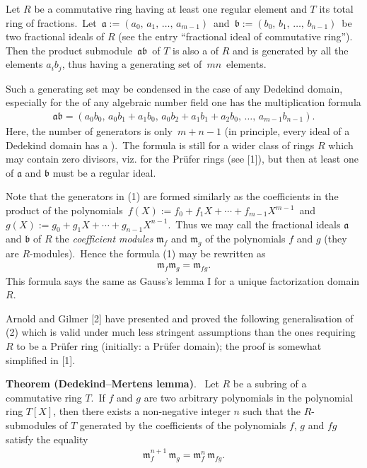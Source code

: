 \documentclass[12pt]{article}
\theoremstyle{definition}
\begin{document}
Let $R$ be a commutative ring having at least one regular element 
and $T$ its total ring of fractions.\, Let\, $\mathfrak{a} := 
(a_0,\,a_1,\,\ldots,\,a_{m-1})$\, and\, $\mathfrak{b} := 
(b_0,\,b_1,\,\ldots,\,b_{n-1})$\, be two fractional ideals of $R$ 
(see the entry ``fractional ideal of commutative ring'').\, Then 
the product submodule \,$\mathfrak{ab}$\, of $T$ is also a 
 of $R$ and is generated by all the elements $a_ib_j$, thus having a generating set of\, $mn$\, elements.

Such a generating set may be condensed in the case of any Dedekind domain, especially for the  of any algebraic number field one has the multiplication formula
\begin{align}
\mathfrak{ab} = (a_0b_0,\,a_0b_1\!+\!a_1b_0,\,a_0b_2\!+\!a_1b_1\!+\!a_2b_0,\,\ldots,\,a_{m-1}b_{n-1}).
\end{align}
Here, the number of generators is only\, $m\!+\!n\!-\!1$ (in principle, every ideal of a Dedekind domain has a ).\, The formula is  still for a wider class of rings $R$ which may contain zero divisors, viz. for the Pr\"ufer rings (see [1]), but then at least one of $\mathfrak{a}$ and $\mathfrak{b}$ must be a regular ideal.

Note that the generators in (1) are formed similarly as the coefficients in the product of the polynomials 
\,$f(X) := f_0\!+\!f_1X\!+\cdots+\!f_{m-1}X^{m-1}$\, and\, 
$g(X) := g_0\!+\!g_1X\!+\cdots+\!g_{n-1}X^{n-1}$.\, Thus we may call the fractional ideals $\mathfrak{a}$ and $\mathfrak{b}$ of $R$ the {\em coefficient modules} $\mathfrak{m}_f$ and $\mathfrak{m}_g$ of the polynomials $f$ and $g$ (they are $R$-modules).\, Hence the formula (1) may be rewritten as
\begin{align}
\mathfrak{m}_f\mathfrak{m}_g = \mathfrak{m}_{fg}.
\end{align}
This formula says the same as Gauss's lemma I for a unique factorization domain $R$.

Arnold and Gilmer [2] have presented and proved the following generalisation of (2) which is valid under much less stringent assumptions than the ones requiring $R$ to be a Pr\"ufer ring (initially: a Pr\"ufer domain); the proof is somewhat simplified in [1].

\textbf{Theorem (Dedekind--Mertens lemma)}.
\, Let $R$ be a subring of a commutative ring $T$.\, If $f$ and 
$g$ are two arbitrary polynomials in the polynomial ring $T[X]$, 
then there exists a non-negative integer $n$ such that the 
$R$-submodules of $T$ generated by the coefficients of the 
polynomials $f$, $g$ and $fg$ satisfy the equality
\begin{align}
\mathfrak{m}_f^{n+1}\,\mathfrak{m}_g = \mathfrak{m}_f^n\,\mathfrak{m}_{fg}.
\end{align}
\end{document}
